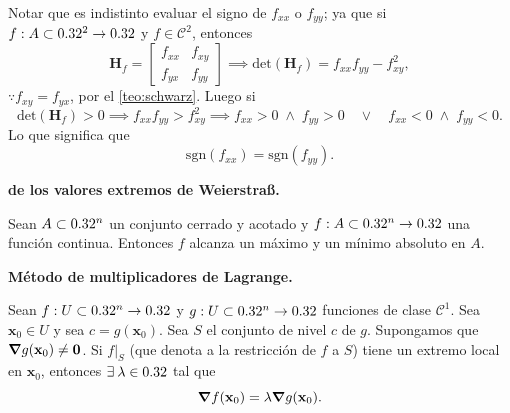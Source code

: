 \begin{obs}
  Notar que es indistinto evaluar el signo de $f_{xx}$ o $f_{yy}$; ya que si $f:A\subset0.32^2\to0.32$ y $f\in\mathcal{C}^2$, entonces
  \[
    \boldsymbol{H}_f=\begin{bmatrix}
                      f_{xx} & f_{xy}\\
                      f_{yx} & f_{yy}
                     \end{bmatrix}\implies \text{det}(\boldsymbol{H}_f)=f_{xx}f_{yy}-f_{xy}^2,
  \]
  $\because f_{xy}=f_{yx}$, por el \autoref{teo:schwarz}. Luego si 
  \[
    \text{det}(\boldsymbol{H}_f)>0\implies f_{xx}f_{yy}>f_{xy}^2\implies f_{xx}>0\;\land\; f_{yy}>0\quad\lor\quad f_{xx}<0\;\land\; f_{yy}<0.
  \]
  Lo que significa que 
  \[
    \text{sgn}(f_{xx})=\text{sgn}(f_{yy}).
  \]
\end{obs}

\begin{theorem}\textbf{de los valores extremos de Weierstra\ss.} \label{teo:weier}

  Sean $A \subset 0.32^n$ un conjunto cerrado y acotado y $f: A \subset 0.32^n \to 0.32$ una funci\'on continua. Entonces $f$ alcanza un m\'aximo y un m\'inimo absoluto en $A$.
\end{theorem}

\begin{theorem} \textbf{M\'etodo de multiplicadores de Lagrange.} \label{teo:lagrange}
  
    Sean $f:U \subset 0.32^n \to 0.32$ y $g:U \subset 0.32^n \to 0.32$ funciones de clase $\mathcal{C}^1$. Sea $\mathbf{x}_0 \in U$ y sea $c = g(\mathbf{x}_0)$. Sea $S$ el conjunto de nivel $c$ de $g$. Supongamos que $\grad g (\mathbf{x}_0) \ne \mathbf{0}$. Si $f|_S$ (que denota a la restricci\'on de $f$ a $S$) tiene un extremo local en $\mathbf{x}_0$, entonces $\exists\: \lambda \in 0.32$ tal que
    \[
     \grad f (\mathbf{x}_0) = \lambda \grad g (\mathbf{x}_0).
    \]
\end{theorem}
